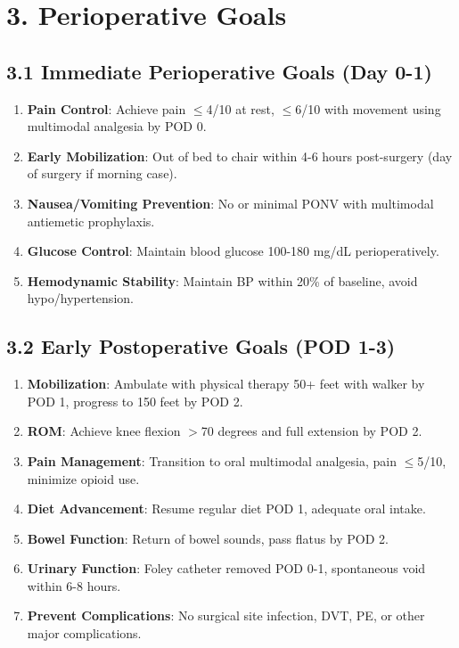 \documentclass[11pt,letterpaper]{article}
\begin{document}
\section*{3. Perioperative Goals}

\subsection*{3.1 Immediate Perioperative Goals (Day 0-1)}

\begin{enumerate}[leftmargin=*]
    \item \textbf{Pain Control}: Achieve pain $\leq$4/10 at rest, $\leq$6/10 with movement using multimodal analgesia by POD 0.
    
    \item \textbf{Early Mobilization}: Out of bed to chair within 4-6 hours post-surgery (day of surgery if morning case).
    
    \item \textbf{Nausea/Vomiting Prevention}: No or minimal PONV with multimodal antiemetic prophylaxis.
    
    \item \textbf{Glucose Control}: Maintain blood glucose 100-180 mg/dL perioperatively.
    
    \item \textbf{Hemodynamic Stability}: Maintain BP within 20\% of baseline, avoid hypo/hypertension.
\end{enumerate}

\subsection*{3.2 Early Postoperative Goals (POD 1-3)}

\begin{enumerate}[leftmargin=*]
    \item \textbf{Mobilization}: Ambulate with physical therapy 50+ feet with walker by POD 1, progress to 150 feet by POD 2.
    
    \item \textbf{ROM}: Achieve knee flexion $>$70 degrees and full extension by POD 2.
    
    \item \textbf{Pain Management}: Transition to oral multimodal analgesia, pain $\leq$5/10, minimize opioid use.
    
    \item \textbf{Diet Advancement}: Resume regular diet POD 1, adequate oral intake.
    
    \item \textbf{Bowel Function}: Return of bowel sounds, pass flatus by POD 2.
    
    \item \textbf{Urinary Function}: Foley catheter removed POD 0-1, spontaneous void within 6-8 hours.
    
    \item \textbf{Prevent Complications}: No surgical site infection, DVT, PE, or other major complications.
\end{enumerate}
\end{document}
